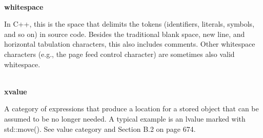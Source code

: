 \hspace*{\fill} \\ %
\noindent
\textbf{whitespace}

In C++, this is the space that delimits the tokens (identifiers, literals, symbols, and so on) in source code. Besides the traditional blank space, new line, and horizontal tabulation characters, this also includes comments. Other whitespace characters (e.g., the page feed control character) are sometimes also valid whitespace.

\hspace*{\fill} \\ %
\noindent
\textbf{xvalue}

A category of expressions that produce a location for a stored object that can be assumed to be no longer needed. A typical example is an lvalue marked with std::move(). See value category and Section B.2 on page 674.




















